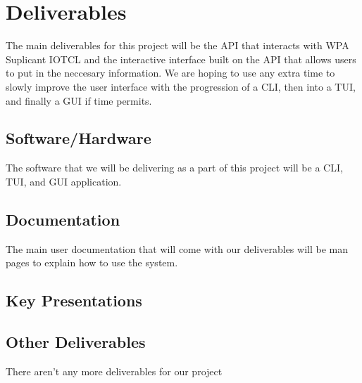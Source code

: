 \section{Deliverables}

The main deliverables for this project will be the API that interacts with WPA Suplicant IOTCL and the interactive interface built on the API that allows users to put in the neccesary information. We are hoping to use any extra time to slowly improve the user interface with the progression of a CLI, then into a TUI, and finally a GUI if time permits.

\subsection{Software/Hardware}

The software that we will be delivering as a part of this project will be a CLI, TUI, and GUI application.

\subsection{Documentation}

The main user documentation that will come with our deliverables will be man pages to explain how to use the system.

\subsection{Key Presentations}



\subsection{Other Deliverables}

There aren't any more deliverables for our project
